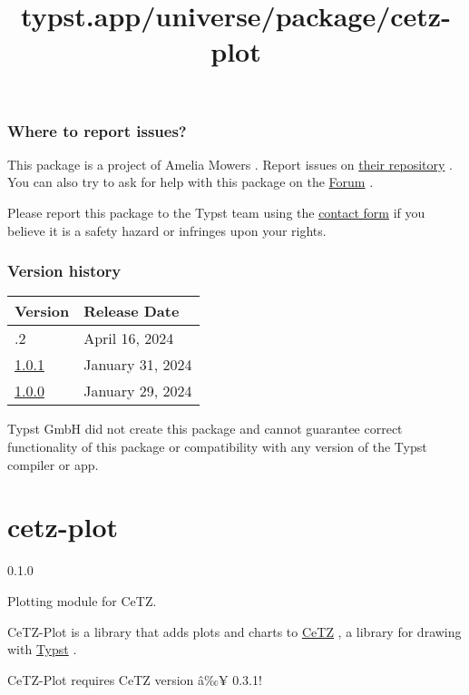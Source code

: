 \subsubsection{Where to report issues?}\label{where-to-report-issues}

This package is a project of Amelia Mowers . Report issues on
\href{https://github.com/Amelia-Mowers/typst-tabut}{their repository} .
You can also try to ask for help with this package on the
\href{https://forum.typst.app}{Forum} .

Please report this package to the Typst team using the
\href{https://typst.app/contact}{contact form} if you believe it is a
safety hazard or infringes upon your rights.

\label{versions}
\subsubsection{Version history}\label{version-history}

\begin{longtable}[]{@{}ll@{}}
\toprule\noalign{}
Version & Release Date \\
\midrule\noalign{}
\endhead
\bottomrule\noalign{}
\endlastfoot
1.0.2 & April 16, 2024 \\
\href{https://typst.app/universe/package/tabut/1.0.1/}{1.0.1} & January
31, 2024 \\
\href{https://typst.app/universe/package/tabut/1.0.0/}{1.0.0} & January
29, 2024 \\
\end{longtable}

Typst GmbH did not create this package and cannot guarantee correct
functionality of this package or compatibility with any version of the
Typst compiler or app.


\title{typst.app/universe/package/cetz-plot}

\label{banner}
\section{cetz-plot}\label{cetz-plot}

{ 0.1.0 }

Plotting module for CeTZ.

\label{readme}
CeTZ-Plot is a library that adds plots and charts to
\href{https://github.com/cetz-package/cetz}{CeTZ} , a library for
drawing with \href{https://typst.app/}{Typst} .

CeTZ-Plot requires CeTZ version â‰¥ 0.3.1!


